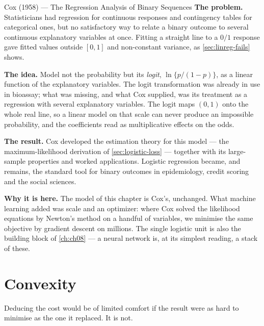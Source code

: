 \begin{researchspotlight}{Cox (1958) --- The Regression Analysis of Binary Sequences}
\textbf{The problem.} Statisticians had regression for continuous responses and
contingency tables for categorical ones, but no satisfactory way to relate a
binary outcome to several continuous explanatory variables at once. Fitting a
straight line to a $0/1$ response gave fitted values outside $[0,1]$ and
non-constant variance, as \cref{sec:linreg-fails} shows.

\textbf{The idea.} Model not the probability but its \emph{logit},
$\ln\{p/(1-p)\}$, as a linear function of the explanatory variables. The logit
transformation was already in use in bioassay; what was missing, and what Cox
supplied, was its treatment as a regression with several explanatory variables.
The logit maps $(0,1)$ onto the whole real line, so a linear model on that scale
can never produce an impossible probability, and the coefficients read as
multiplicative effects on the odds.

\textbf{The result.} Cox developed the estimation theory for this model --- the
maximum-likelihood derivation of \cref{sec:logistic-loss} --- together with its
large-sample properties and worked applications. Logistic regression became, and
remains, the standard tool for binary outcomes in epidemiology, credit scoring
and the social sciences.

\textbf{Why it is here.} The model of this chapter is Cox's, unchanged. What
machine learning added was scale and an optimizer: where Cox solved the
likelihood equations by Newton's method on a handful of variables, we minimise
the same objective by gradient descent on millions. The single logistic unit is
also the building block of \cref{ch:ch08} --- a neural network is, at its
simplest reading, a stack of these.
\parencite{cox1958}
\end{researchspotlight}

\section{Convexity}
\label{sec:logistic-convexity}

Deducing the cost would be of limited comfort if the result were as hard to
minimise as the one it replaced. It is not.

